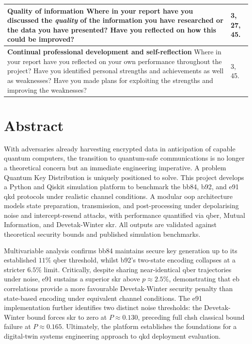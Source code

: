 \documentclass[11pt, a4paper]{report}
\begin{document}
\begin{tabular}{|p{}|p{}|}
\hline
\textbf{Quality of information} Where in your report have you discussed the \textit{quality} of the information you have researched or the data you have presented? Have you reflected on how this could be improved? & 3, 27, 45. \\
\hline
\textbf{Continual professional development and self-reflection} Where in your report have you reflected on your own performance throughout the project? Have you identified personal strengths and achievements as well as weaknesses? Have you made plans for exploiting the strengths and improving the weaknesses? & 3, 45. \\
\hline
\end{tabular}




\clearpage
\chapter*{Abstract}

{\fontsize{11}{13}\selectfont
With adversaries already harvesting encrypted data in anticipation of capable quantum computers, the transition to quantum-safe communications is no longer a theoretical concern but an immediate engineering imperative. A problem Quantum Key Distribution is uniquely positioned to solve. This project develops a Python and Qiskit simulation platform to benchmark the \gls{bb84}, \gls{b92}, and \gls{e91} \gls{qkd} protocols under realistic channel conditions. A modular \gls{oop} architecture models state preparation, transmission, and post-processing under depolarising noise and intercept-resend attacks, with performance quantified via \gls{qber}, Mutual Information, and Devetak-Winter \gls{skr}. All outputs are validated against theoretical security bounds and published simulation benchmarks.

Multivariable analysis confirms \gls{bb84} maintains secure key generation up to its established $11\%$ \gls{qber} threshold, whilst \gls{b92}'s two-state encoding collapses at a stricter $6.5\%$ limit. Critically, despite sharing near-identical \gls{qber} trajectories under noise, \gls{e91} sustains a superior \gls{skr} above $p \approx 2.5\%$, demonstrating that \gls{eb} correlations provide a more favourable Devetak-Winter security penalty than state-based encoding under equivalent channel conditions. The \gls{e91} implementation further identifies two distinct noise thresholds: the Devetak-Winter bound forces \gls{skr} to zero at $P \approx 0.130$, preceding full \gls{chsh} classical bound failure at $P \approx 0.165$. Ultimately, the platform establishes the foundations for a digital-twin systems engineering approach to \gls{qkd} deployment evaluation.


\par
}
\end{document}
